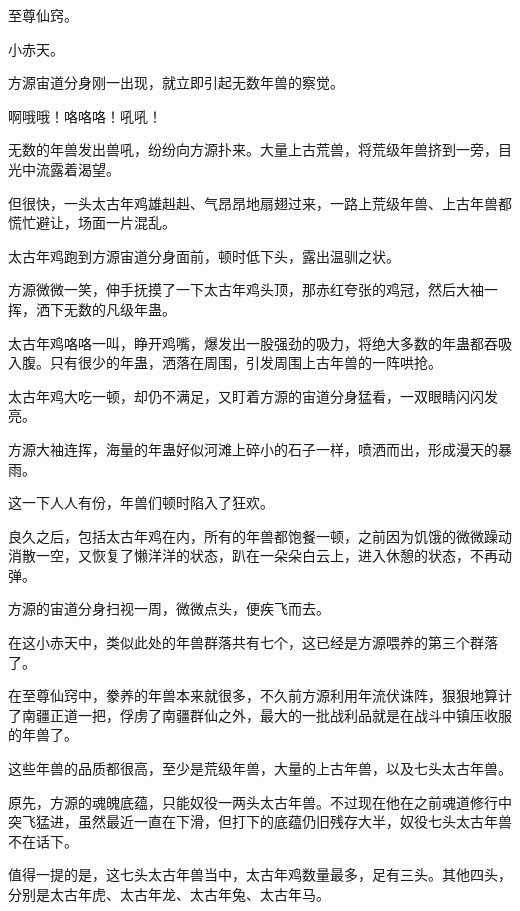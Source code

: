 
\begin{this_body}



至尊仙窍。

小赤天。

方源宙道分身刚一出现，就立即引起无数年兽的察觉。

啊哦哦！咯咯咯！吼吼！

无数的年兽发出兽吼，纷纷向方源扑来。大量上古荒兽，将荒级年兽挤到一旁，目光中流露着渴望。

但很快，一头太古年鸡雄赳赳、气昂昂地扇翅过来，一路上荒级年兽、上古年兽都慌忙避让，场面一片混乱。

太古年鸡跑到方源宙道分身面前，顿时低下头，露出温驯之状。

方源微微一笑，伸手抚摸了一下太古年鸡头顶，那赤红夸张的鸡冠，然后大袖一挥，洒下无数的凡级年蛊。

太古年鸡咯咯一叫，睁开鸡嘴，爆发出一股强劲的吸力，将绝大多数的年蛊都吞吸入腹。只有很少的年蛊，洒落在周围，引发周围上古年兽的一阵哄抢。

太古年鸡大吃一顿，却仍不满足，又盯着方源的宙道分身猛看，一双眼睛闪闪发亮。

方源大袖连挥，海量的年蛊好似河滩上碎小的石子一样，喷洒而出，形成漫天的暴雨。

这一下人人有份，年兽们顿时陷入了狂欢。

良久之后，包括太古年鸡在内，所有的年兽都饱餐一顿，之前因为饥饿的微微躁动消散一空，又恢复了懒洋洋的状态，趴在一朵朵白云上，进入休憩的状态，不再动弹。

方源的宙道分身扫视一周，微微点头，便疾飞而去。

在这小赤天中，类似此处的年兽群落共有七个，这已经是方源喂养的第三个群落了。

在至尊仙窍中，豢养的年兽本来就很多，不久前方源利用年流伏诛阵，狠狠地算计了南疆正道一把，俘虏了南疆群仙之外，最大的一批战利品就是在战斗中镇压收服的年兽了。

这些年兽的品质都很高，至少是荒级年兽，大量的上古年兽，以及七头太古年兽。

原先，方源的魂魄底蕴，只能奴役一两头太古年兽。不过现在他在之前魂道修行中突飞猛进，虽然最近一直在下滑，但打下的底蕴仍旧残存大半，奴役七头太古年兽不在话下。

值得一提的是，这七头太古年兽当中，太古年鸡数量最多，足有三头。其他四头，分别是太古年虎、太古年龙、太古年兔、太古年马。


\end{this_body}
